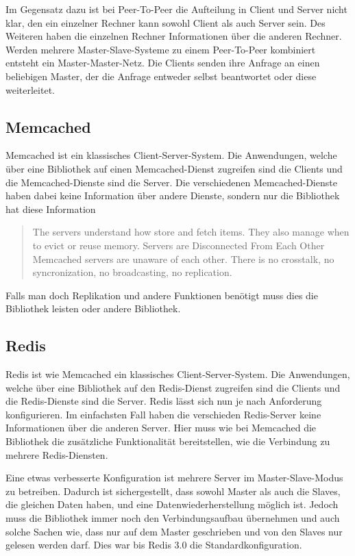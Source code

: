 Im Gegensatz dazu ist bei Peer-To-Peer die Aufteilung in Client und Server
nicht klar, den ein einzelner Rechner kann sowohl Client als auch Server sein.
Des Weiteren haben die einzelnen Rechner Informationen über die anderen Rechner.
Werden mehrere Master-Slave-Systeme zu einem Peer-To-Peer kombiniert entsteht
ein Master-Master-Netz. Die Clients senden ihre Anfrage an einen beliebigen
Master, der die Anfrage entweder selbst beantwortet oder diese weiterleitet.

\subsection{Memcached}
Memcached ist ein klassisches Client-Server-System. Die Anwendungen, welche über
eine Bibliothek auf einen Memcached-Dienst zugreifen sind die Clients und die
Memcached-Dienste sind die Server. Die verschiedenen Memcached-Dienste haben
dabei keine Information über andere Dienste, sondern nur die Bibliothek hat
diese Information

\foreignblockquote{english}[\cite{Memcached2015}]{The servers understand how
store and fetch items. They also manage when to evict or reuse memory. Servers
are Disconnected From Each Other Memcached servers are unaware of each other.
There is no crosstalk, no syncronization, no broadcasting, no replication.}

Falls man doch Replikation und andere Funktionen benötigt muss dies die
Bibliothek leisten oder andere Bibliothek.

\subsection{Redis}
Redis ist wie Memcached ein klassisches Client-Server-System. Die Anwendungen,
welche über eine Bibliothek auf den Redis-Dienst zugreifen sind die Clients und
die Redis-Dienste sind die Server. Redis lässt sich nun je nach Anforderung
konfigurieren. Im einfachsten Fall haben die verschieden Redis-Server keine
Informationen über die anderen Server. Hier muss wie bei Memcached die
Bibliothek die zusätzliche Funktionalität bereitstellen, wie die Verbindung zu
mehrere Redis-Diensten.

Eine etwas verbesserte Konfiguration ist mehrere Server im Master-Slave-Modus
zu betreiben. Dadurch ist sichergestellt, dass sowohl Master als auch die
Slaves, die gleichen Daten haben, und eine Datenwiederherstellung möglich ist.
Jedoch muss die Bibliothek immer noch den Verbindungsaufbau übernehmen und auch
solche Sachen wie, dass nur auf dem Master geschrieben und von den Slaves nur
gelesen werden darf. Dies war bis Redis 3.0 die Standardkonfiguration.

